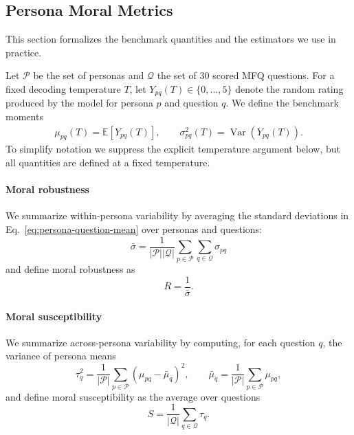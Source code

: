 \documentclass{article}
\begin{document}
\subsection{Persona Moral Metrics}

This section formalizes the benchmark quantities and the estimators we use in practice.

Let \(\mathcal{P}\) be the set of personas and \(\mathcal{Q}\) the set of 30 scored MFQ questions. For a fixed decoding temperature \(T\), let \(Y_{pq}(T)\in\{0,\ldots,5\}\) denote the random rating produced by the model for persona \(p\) and question \(q\). We define the benchmark moments
\begin{align}
  \mu_{pq}(T) = \mathbb{E}[Y_{pq}(T)], \qquad \sigma_{pq}^2(T) = \operatorname{Var}(Y_{pq}(T)).
  \label{eq:persona-question-mean}
\end{align}
To simplify notation we suppress the explicit temperature argument below, but all quantities are defined at a fixed temperature.

\paragraph{Moral robustness} We summarize within-persona variability by averaging the standard deviations in Eq.~\eqref{eq:persona-question-mean} over personas and questions:
\begin{equation}
  \label{eq:mean-inv-robustness}
  \bar{\sigma} = \frac{1}{|\mathcal{P}||\mathcal{Q}|}\sum_{p \in \mathcal{P}}\sum_{q \in \mathcal{Q}}\sigma_{pq}
\end{equation}
and define moral robustness as
\begin{equation}
  R = \frac{1}{\bar{\sigma}}.
  \label{eq:robustness}
\end{equation}


\paragraph{Moral susceptibility} We summarize across-persona variability by computing, for each question \(q\), the variance of persona means
\begin{equation}
  \tau_q^2 = \frac{1}{|\mathcal{P}|} \sum_{p \in \mathcal{P}}(\mu_{pq} - \bar{\mu}_q)^2,
  \qquad
  \bar{\mu}_q = \frac{1}{|\mathcal{P}|} \sum_{p \in \mathcal{P}} \mu_{pq},
  \label{eq:question-dispersion}
\end{equation}
and define moral susceptibility as the average over questions
\begin{equation}
  \label{eq:overall-susceptibility}
  S = \frac{1}{|\mathcal{Q}|}\sum_{q \in \mathcal{Q}}\tau_q.
\end{equation}
\end{document}
